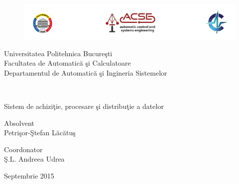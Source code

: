 \documentclass[a4paper,12pt, oneside, titlepage]{book}
\begin{document}
\pagestyle{empty}    
\begingroup
{}


\begin{titlepage}
\thispagestyle{empty}
\begin{figure}[H]
	\centering
	\includegraphics[width=1.2\textwidth, center]{logos}
\end{figure}
\begin{center}
	\large{Universitatea Politehnica Bucureşti\\
	Facultatea de Automatică şi Calculatoare\\
	Departamentul de Automatică şi Ingineria Sistemelor\\}
\end{center}
\mbox{}\\[6pc]
\begin{center}
	
	\Huge{Sistem de achiziţie, procesare şi distribuţie a datelor}\\[2pc]
	
\end{center}
\vfill
\begin{flushright} 
	\Large{Absolvent \\
		Petrişor-Ştefan Lăcătuş}\\[1pc]
\end{flushright}
\noindent \Large{Coordonator\\
	 Ş.L. Andreea Udrea}\\

\begin{center} 
	\large{Septembrie 2015}\\[2pc]
\end{center}
\end{titlepage}


\tableofcontents 

\endgroup %

\clearpage
\pagestyle{plain}      



 

 

 



  

\printbibliography[heading=bibintoc, title={Bibliografie}]
\end{document}
